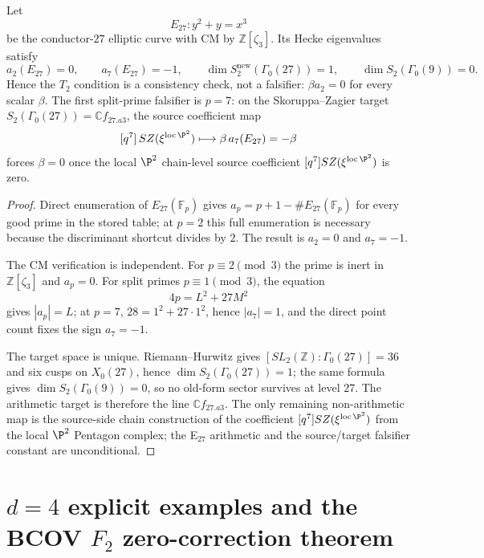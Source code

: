 \begin{theorem}
\label{thm:local-p2-e27-arithmetic-obstruction}
Let
\[
 E_{27}\colon y^2 + y = x^3
\]
be the conductor-$27$ elliptic curve with CM by
$\mathbb{Z}[\zeta_3]$. Its Hecke eigenvalues satisfy
\[
 a_2(E_{27}) = 0,\qquad
 a_7(E_{27}) = -1,\qquad
 \dim S_2^{\mathrm{new}}(\Gamma_0(27)) = 1,\qquad
 \dim S_2(\Gamma_0(9)) = 0 .
\]
Hence the $T_2$ condition is a consistency check, not a falsifier:
$\beta a_2 = 0$ for every scalar $\beta$. The first split-prime
falsifier is $p = 7$: on the Skoruppa--Zagier target
$S_2(\Gamma_0(27)) = \mathbb{C} f_{27.a3}$, the source coefficient
map
\[
 [q^7]\,SZ(\xi^{\mathrm{loc}\,\P^2}) \longmapsto
 \beta\, a_7(E_{27}) = -\beta
\]
forces $\beta = 0$ once the local $\P^2$ chain-level source coefficient
$[q^7]SZ(\xi^{\mathrm{loc}\,\P^2})$ is zero.
\end{theorem}

\begin{proof}
Direct enumeration
of $E_{27}(\mathbb{F}_p)$ gives $a_p = p + 1 - \#E_{27}(\mathbb{F}_p)$
for every good prime in the stored table; at $p = 2$ this full
enumeration is necessary because the discriminant shortcut divides by
$2$. The result is $a_2 = 0$ and $a_7 = -1$.

The CM verification is independent. For $p \equiv 2 \pmod 3$ the prime
is inert in $\mathbb{Z}[\zeta_3]$ and $a_p = 0$. For split primes
$p \equiv 1 \pmod 3$, the equation
\[
 4p = L^2 + 27M^2
\]
gives $|a_p| = L$; at $p = 7$, $28 = 1^2 + 27\cdot 1^2$, hence
 $|a_7| = 1$, and the direct point count fixes the sign $a_7=-1$.

The target space is unique. Riemann--Hurwitz gives
$[SL_2(\mathbb{Z}):\Gamma_0(27)] = 36$ and six cusps on $X_0(27)$,
hence $\dim S_2(\Gamma_0(27)) = 1$; the same formula gives
$\dim S_2(\Gamma_0(9)) = 0$, so no old-form sector survives at level
$27$. The arithmetic target is therefore the line
$\mathbb{C}f_{27.a3}$. The only remaining non-arithmetic map is the
source-side chain construction of the coefficient
$[q^7]SZ(\xi^{\mathrm{loc}\,\P^2})$ from the local $\P^2$ Pentagon
complex; the E$_{27}$ arithmetic and the source/target falsifier
constant are unconditional.
\end{proof}

\section{\texorpdfstring{$d = 4$}{d = 4} explicit examples and the BCOV \texorpdfstring{$F_2$}{F-2} zero-correction theorem}
\label{sec:cy-strat-d4-explicit}

